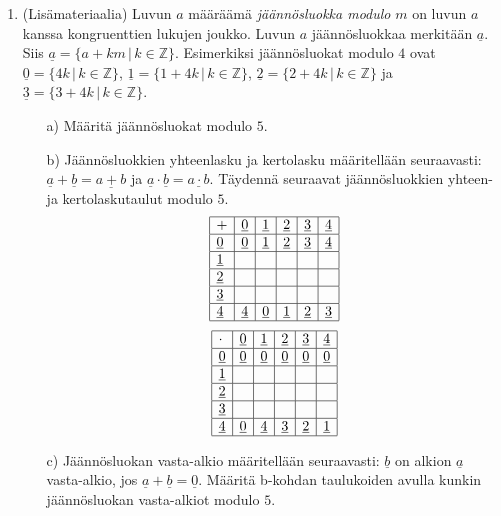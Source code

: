 \begin{enumerate}
\item (Lisämateriaalia)
Luvun $a$ määräämä {\em jäännösluokka modulo} $m$ on luvun $a$ kanssa kongruenttien lukujen joukko. Luvun $a$ jäännösluokkaa merkitään $\underline{a}$. Siis $\underline{a} = \{a + km\, |\, k\in \mathbb{Z}\}$. Esimerkiksi jäännösluokat modulo $4$ ovat $\underline{0}=\{4k\, |\, k\in \mathbb{Z}\}$, $\underline{1}=\{1+4k\, |\, k\in \mathbb{Z}\}$, $\underline{2}=\{2+4k\, |\, k\in \mathbb{Z}\}$ ja $\underline{3}=\{3+4k\, |\, k\in \mathbb{Z}\}$.
\begin{itemize}
\item[a)] Määritä jäännösluokat modulo $5$.
\item[b)] Jäännösluokkien yhteenlasku ja kertolasku määritellään seuraavasti: $\underline{a} + \underline{b} = \underline{a + b}$ ja $\underline{a} \cdot \underline{b} = \underline{a\cdot b}$. Täydennä seuraavat jäännösluokkien yhteen- ja kertolaskutaulut modulo $5$.
\[
\begin{array}{|l|l|l|l|l|l|}
\hline
+& \underline{0} & \underline{1} & \underline{2} & \underline{3} & \underline{4} \\ \hline
\underline{0} & \underline{0} & \underline{1} & \underline{2} &  \underline{3} & \underline{4}  
\\ \hline
 \underline{1} &&&&& \\ \hline
 \underline{2} &&&&& \\ \hline
 \underline{3} &&&&& \\ \hline
\underline{4} & \underline{4} & \underline{0} & \underline{1} &  \underline{2} & \underline{3}  
\\ \hline
\end{array}
\]
\[
\begin{array}{|l|l|l|l|l|l|}
\hline
\cdot& \underline{0} & \underline{1} & \underline{2} & \underline{3} & \underline{4} \\ \hline
\underline{0} & \underline{0} & \underline{0} & \underline{0} &  \underline{0} & \underline{0}  
\\ \hline
 \underline{1} &&&&& \\ \hline
 \underline{2} &&&&& \\ \hline
 \underline{3} &&&&& \\ \hline
\underline{4} & \underline{0} & \underline{4} & \underline{3} &  \underline{2} & \underline{1}  
\\ \hline
\end{array}
\]
\item[c)] Jäännösluokan vasta-alkio määritellään seuraavasti: $\underline{b}$ on alkion $\underline{a}$ vasta-alkio, jos $\underline{a} + \underline{b} = \underline{0}$. Määritä b-kohdan  taulukoiden avulla kunkin jäännösluokan vasta-alkiot modulo $5$.

\end{itemize}
\end{enumerate}
